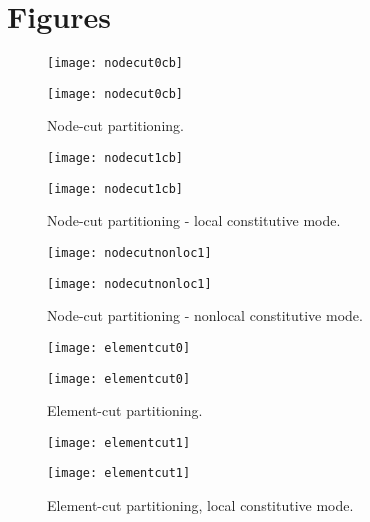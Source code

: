 \documentclass[a4paper]{article}
\begin{document}
\section{Figures}

\begin{figure}[htb]
\begin{htmlonly}
  \centerline{\texttt{[image: nodecut0cb]}}
\end{htmlonly}
\centerline{\texttt{[image: nodecut0cb]}}
\caption{Node-cut partitioning.}
\label{nodecut}
\end{figure}

\begin{figure}[htb]
\begin{htmlonly}
  \centerline{\texttt{[image: nodecut1cb]}}
\end{htmlonly}
\centerline{\texttt{[image: nodecut1cb]}}
\caption{Node-cut partitioning - local constitutive mode.}
\label{nodecut-lm}
\end{figure}

\begin{figure}[htb]
\begin{htmlonly}
  \centerline{\texttt{[image: nodecutnonloc1]}}
\end{htmlonly}
\centerline{\texttt{[image: nodecutnonloc1]}}
\caption{Node-cut partitioning - nonlocal constitutive mode.}
\label{nodecut-nlm}
\end{figure}


\begin{figure}[htb]
\begin{htmlonly}
  \centerline{\texttt{[image: elementcut0]}}
\end{htmlonly}
\centerline{\texttt{[image: elementcut0]}}
\caption{Element-cut partitioning.}
\label{elmentcut}
\end{figure}

\begin{figure}[htb]
\begin{htmlonly}
  \centerline{\texttt{[image: elementcut1]}}
\end{htmlonly}
\centerline{\texttt{[image: elementcut1]}}
\caption{Element-cut partitioning, local constitutive mode.}
\label{elmentcut-lm}
\end{figure}
\end{document}
